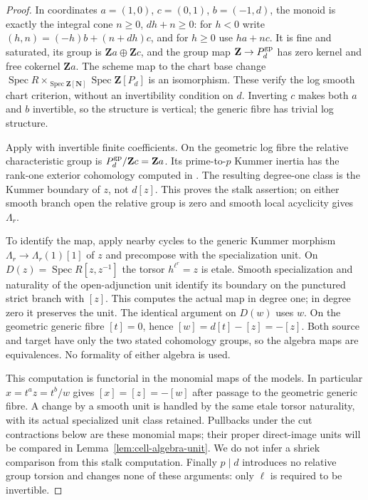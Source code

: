\documentclass[11pt]{article}
\theoremstyle{definition}
\theoremstyle{remark}
\newcommand{\Spec}{\operatorname{Spec}}
\begin{document}
\begin{proof}
In coordinates $a=(1,0)$, $c=(0,1)$, $b=(-1,d)$, the monoid is
exactly the integral cone $n\geq0$, $dh+n\geq0$: for $h<0$ write
$(h,n)=(-h)b+(n+dh)c$, and for $h\geq0$ use $ha+nc$.
It is fine and saturated, its group is $\mathbf Za\oplus\mathbf Zc$,
and the group map $\mathbf Z\to P_d^{\rm gp}$ has zero kernel and
free cokernel $\mathbf Za$.  The scheme map to the chart base change
$\Spec R\times_{\Spec\mathbf Z[\mathbf N]}\Spec\mathbf Z[P_d]$
is an isomorphism.  These verify the log smooth chart criterion,
without an invertibility condition on $d$.  Inverting $c$ makes both
$a$ and $b$ invertible, so the structure is vertical; the generic
fibre has trivial log structure.

Apply \cite[Theorem 8.3 and Corollary 8.4]{IllusieOverview} with
invertible finite coefficients.  On the geometric log fibre the
relative characteristic group is $P_d^{\rm gp}/\mathbf Zc=\mathbf Za$.
Its prime-to-$p$ Kummer inertia has the rank-one exterior cohomology
computed in \cite[\S5]{IllusieOverview}.  The resulting degree-one
class is the Kummer boundary of $z$, not $d[z]$.  This proves the
stalk assertion; on either smooth branch open the relative group is
zero and smooth local acyclicity gives $\Lambda_r$.

To identify the map, apply nearby cycles to the generic Kummer
morphism $\Lambda_r\to\Lambda_r(1)[1]$ of $z$ and precompose with
the specialization unit.  On $D(z)=\Spec R[z,z^{-1}]$ the torsor
$h^{\ell^r}=z$ is etale.  Smooth specialization and naturality of the
open-adjunction unit identify its boundary on the punctured strict
branch with $[z]$.  This computes the actual map in degree one; in
degree zero it preserves the unit.  The identical argument on $D(w)$
uses $w$.  On the geometric generic fibre $[t]=0$, hence
$[w]=d[t]-[z]=-[z]$.  Both source and target have only the two stated
cohomology groups, so the algebra maps are equivalences.  No
formality of either algebra is used.

This computation is functorial in the monomial maps of the models.
In particular $x=t^a z=t^b/w$ gives $[x]=[z]=-[w]$ after passage to
the geometric generic fibre.  A change by a smooth unit is handled
by the same etale torsor naturality, with its actual specialized unit
class retained.  Pullbacks under the cut contractions below are
these monomial maps; their proper direct-image units will be compared
in Lemma~\ref{lem:cell-algebra-unit}.  We do not infer a shriek
comparison from this stalk computation.  Finally $p\mid d$ introduces
no relative group torsion and changes none of these arguments: only
$\ell$ is required to be invertible.


\end{proof}
\end{document}
